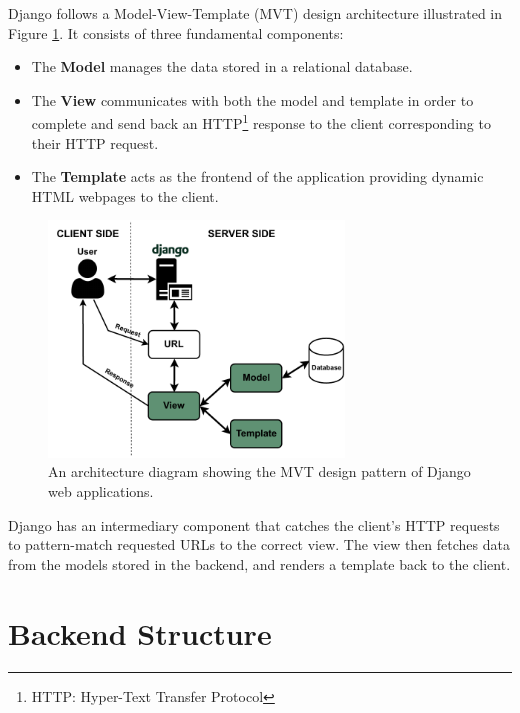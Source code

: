 \documentclass{l4proj}
\begin{document}
Django follows a Model-View-Template (MVT) design architecture illustrated in Figure \ref{fig:django_architecture}. It consists of three fundamental components:
\begin{itemize}
    \item The \textbf{Model} manages the data stored in a relational database.
    \item The \textbf{View} communicates with both the model and template in order to complete and send back an HTTP\footnote{HTTP: Hyper-Text Transfer Protocol} response to the client corresponding to their HTTP request.
    \item The \textbf{Template} acts as the frontend of the application providing dynamic HTML webpages to the client.
\end{itemize}

\begin{figure}
    \centering
    \includegraphics[width=0.7\textwidth]{figures/django_architecture.pdf}
    \caption{An architecture diagram showing the MVT design pattern of Django web applications.}
    \label{fig:django_architecture}
\end{figure}

Django has an intermediary component that catches the client's HTTP requests to pattern-match requested URLs to the correct view. The view then fetches data from the models stored in the backend, and renders a template back to the client.


\section{Backend Structure}
\end{document}
